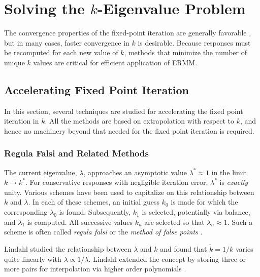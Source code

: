 \section{Solving the $k$-Eigenvalue Problem}
\label{sec:outer}

The convergence properties of the fixed-point iteration
are generally favorable \cite{roberts2014cer}, but in many cases,
faster convergence in $k$ is desirable.  Because responses 
must be recomputed for each new value of $k$,  methods that 
minimize the number of unique $k$ values are critical for 
efficient application of ERMM.

\subsection{Accelerating Fixed Point Iteration}

In this section, several techniques are studied for 
accelerating the fixed point iteration in $k$.  All 
the methods are based on extrapolation with respect to 
$k$, and hence no machinery beyond that needed for the 
fixed point iteration is required.

\subsubsection{Regula Falsi and Related Methods}
\label{sec:extrapolationmethods}

The current eigenvalue, $\lambda$, approaches an 
asymptotic value $\lambda^* \approx 1$ in the 
limit $k\to k^*$.  For conservative responses with negligible 
iteration error, $\lambda^*$ is {\it exactly} unity.  
Various 
schemes have been used to capitalize on this relationship between 
$k$ and $\lambda$.  In each of these
schemes, an initial guess $k_0$ is made for which the corresponding 
$\lambda_0$ is found.  Subsequently, $k_1$ is selected, potentially via 
balance, and $\lambda_1$ is computed.  All successive values $k_n$  
are selected so that $\lambda_n \approx 1$.  Such a scheme is often
called {\it regula falsi} or the {\it method of false points} 
\cite{lindahl1976mdr}.

Lindahl studied the relationship between $\lambda$ and $k$ and found that 
$\tilde{k} = 1/k$ varies quite 
linearly with $\tilde{\lambda} \propto 1/\lambda$.
Lindahl extended the concept by storing three or more pairs for interpolation
via higher order polynomials \cite{lindahl1976mdr}.


